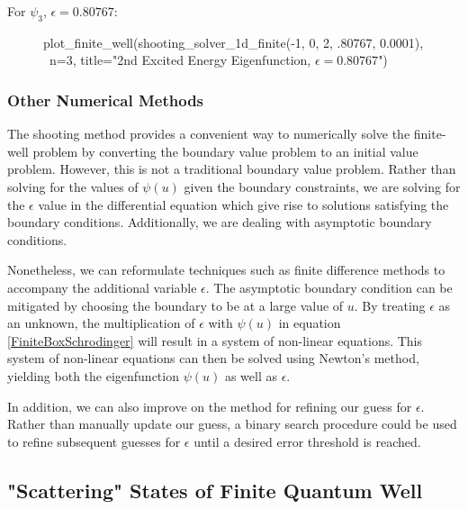 \documentclass{article}
\begin{document}
For $\psi_3$, $\epsilon = 0.80767$:

\begin{figure}[H]
\begin{sageblock}
plot_finite_well(shooting_solver_1d_finite(-1, 0, 2, .80767, 0.0001), \
                      n=3, title="2nd Excited Energy Eigenfunction, $\epsilon=0.80767$")
\end{sageblock}
\vspace{-.1in}
\centering
{}
\end{figure}

\subsubsection{Other Numerical Methods} 
The shooting method provides a convenient way to numerically solve the
finite-well problem by converting the boundary value problem to an initial
value problem. However, this is not a traditional boundary value problem.
Rather than solving for the values of $\psi(u)$ given the boundary constraints,
we are solving for the $\epsilon$ value in the differential equation which give
rise to solutions satisfying the boundary conditions. Additionally, we are dealing
with asymptotic boundary conditions.

Nonetheless, we can reformulate techniques such as finite difference methods to
accompany the additional variable $\epsilon$. The asymptotic boundary condition
can be mitigated by choosing the boundary to be at a large value of $u$. By
treating $\epsilon$ as an unknown, the multiplication of $\epsilon$ with
$\psi(u)$ in equation \eqref{FiniteBoxSchrodinger} will result in a system of
non-linear equations.  This system of non-linear equations can then be solved
using Newton's method, yielding both the eigenfunction $\psi(u)$ as well as
$\epsilon$. 

In addition, we can also improve on the method for refining our guess for $\epsilon$. 
Rather than manually update our guess, a binary search procedure could be used to refine
subsequent guesses for $\epsilon$ until a desired error threshold is reached.

\subsection{"Scattering" States of Finite Quantum Well}\label{sec:ScatterStates}
\end{document}
